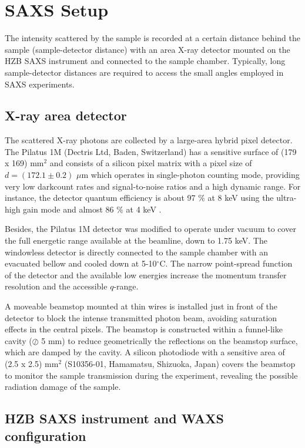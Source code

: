 \section{SAXS Setup}

The intensity scattered by the sample is recorded at a certain distance behind the sample (sample-detector distance) with an area X-ray detector mounted on the HZB SAXS instrument and connected to the sample chamber. Typically, long sample-detector distances are required to access the small angles employed in SAXS experiments.

\subsection{X-ray area detector}
\label{sec:pilatus}

The scattered X-ray photons are collected by a large-area hybrid pixel detector. The Pilatus 1M (Dectris Ltd, Baden, Switzerland) has a sensitive surface of (179 x 169) mm$^2$ and consists of a silicon pixel matrix with a pixel size of $d = (172.1 \pm 0.2)$ $\mu$m which operates in single-photon counting mode, providing very low darkcount rates and signal-to-noise ratios and a high dynamic range. For instance, the detector quantum efficiency is about 97 $\%$ at 8 keV using the ultra-high gain mode and almost 86 $\%$ at 4 keV \citep{wernecke_characterization_2014}.

Besides, the Pilatus 1M detector was modified to operate under vacuum to cover the full energetic range available at the beamline, down to 1.75 keV. The windowless detector is directly connected to the sample chamber with an evacuated bellow and cooled down at 5-10$^{\circ}$C. The narrow point-spread function of the detector and the available low energies increase the momentum transfer resolution and the accessible $q$-range.

A moveable beamstop mounted at thin wires is installed just in front of the detector to block the intense transmitted photon beam, avoiding saturation effects in the central pixels. The beamstop is constructed within a funnel-like cavity ($\oslash$ 5 mm) to reduce geometrically the reflections on the beamstop surface, which are damped by the cavity. A silicon photodiode with a sensitive area of (2.5 x 2.5) mm$^2$ (S10356-01, Hamamatsu, Shizuoka, Japan) covers the beamstop to monitor the sample transmission during the experiment, revealing the possible radiation damage of the sample.

\subsection{HZB SAXS instrument and WAXS configuration}

